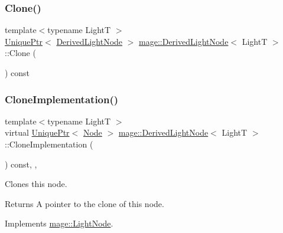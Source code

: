 \subsubsection{\texorpdfstring{Clone()}{Clone()}}
{\footnotesize\ttfamily template$<$typename LightT $>$ \\
\hyperlink{namespacemage_a8c307fbcc33bce9b7f2aa4c26c3b95cf}{Unique\+Ptr}$<$ \hyperlink{classmage_1_1_derived_light_node}{Derived\+Light\+Node} $>$ \hyperlink{classmage_1_1_derived_light_node}{mage\+::\+Derived\+Light\+Node}$<$ LightT $>$\+::Clone (\begin{DoxyParamCaption}{ }\end{DoxyParamCaption}) const}

\hypertarget{classmage_1_1_derived_light_node_acf8858989780bf45a45c55a7c5564314}{}\label{classmage_1_1_derived_light_node_acf8858989780bf45a45c55a7c5564314} 
\subsubsection{\texorpdfstring{Clone\+Implementation()}{CloneImplementation()}}
{\footnotesize\ttfamily template$<$typename LightT $>$ \\
virtual \hyperlink{namespacemage_a8c307fbcc33bce9b7f2aa4c26c3b95cf}{Unique\+Ptr}$<$ \hyperlink{classmage_1_1_node}{Node} $>$ \hyperlink{classmage_1_1_derived_light_node}{mage\+::\+Derived\+Light\+Node}$<$ LightT $>$\+::Clone\+Implementation (\begin{DoxyParamCaption}{ }\end{DoxyParamCaption}) const\hspace{0.3cm}{\ttfamily [override]}, {\ttfamily [private]}, {\ttfamily [virtual]}}

Clones this node.

\begin{DoxyReturn}{Returns}
A pointer to the clone of this node. 
\end{DoxyReturn}


Implements \hyperlink{classmage_1_1_light_node_aea97601d0a4b8073a1c655ca334af242}{mage\+::\+Light\+Node}.

\hypertarget{classmage_1_1_derived_light_node_ac4b4f6985aac0e00238ee7aac8cf06e3}{}\label{classmage_1_1_derived_light_node_ac4b4f6985aac0e00238ee7aac8cf06e3} 

